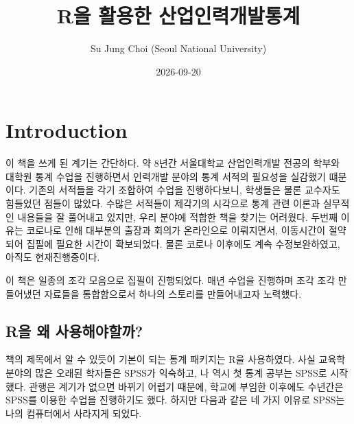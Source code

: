 \documentclass[
]{book}
\title{R을 활용한 산업인력개발통계}
\author{Su Jung Choi (Seoul National University)}
\date{2026-09-20}
\begin{document}
\maketitle

{
\setcounter{tocdepth}{1}
\tableofcontents
}
\mainmatter

\chapter{Introduction}\label{intro}

이 책을 쓰게 된 계기는 간단하다. 약 8년간 서울대학교 산업인력개발 전공의 학부와 대학원 통계 수업을 진행하면서 인력개발 분야의 통계 서적의 필요성을 실감했기 떄문이다. 기존의 서적들을 각기 조합하여 수업을 진행하다보니, 학생들은 물론 교수자도 힘들었던 점들이 많았다. 수많은 서적들이 제각기의 시각으로 통계 관련 이론과 실무적인 내용들을 잘 풀어내고 있지만, 우리 분야에 적합한 책을 찾기는 어려웠다. 두번째 이유는 코로나로 인해 대부분의 출장과 회의가 온라인으로 이뤄지면서, 이동시간이 절약되어 집필에 필요한 시간이 확보되었다. 물론 코로나 이후에도 계속 수정보완하였고, 아직도 현재진행중이다.

이 책은 일종의 조각 모음으로 집필이 진행되었다. 매년 수업을 진행하며 조각 조각 만들어냈던 자료들을 통합함으로서 하나의 스토리를 만들어내고자 노력했다.

\section{R을 왜 사용해야할까?}\label{ruxc744-uxc65c-uxc0acuxc6a9uxd574uxc57cuxd560uxae4c}

책의 제목에서 알 수 있듯이 기본이 되는 통계 패키지는 R을 사용하였다. 사실 교육학 분야의 많은 오래된 학자들은 SPSS가 익숙하고, 나 역시 첫 통계 공부는 SPSS로 시작했다. 관행은 계기가 없으면 바뀌기 어렵기 때문에, 학교에 부임한 이후에도 수년간은 SPSS를 이용한 수업을 진행하기도 했다. 하지만 다음과 같은 네 가지 이유로 SPSS는 나의 컴퓨터에서 사라지게 되었다.
\end{document}
